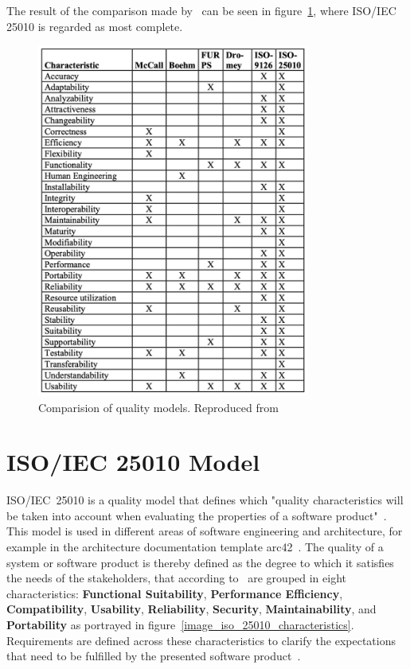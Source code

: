 The result of the comparison made by~\cite{quality_models} can be seen in figure~\ref{image_quality_models_comparison},
where ISO/IEC 25010 is regarded as most complete.

\begin{figure}[h!]
\centering
\includegraphics[width=0.8\textwidth]{images/Untitled_13.png}
\caption{Comparision of quality models. Reproduced from~\cite{quality_models}}
    \label{image_quality_models_comparison}
\end{figure}

\clearpage
\hypertarget{the-isoiec-25010-model}{%
\section{ISO/IEC 25010
Model}\label{the-isoiec-25010-model}}

ISO/IEC\ 25010 is a quality model that defines which "quality
characteristics will be taken into account when evaluating the
properties of a software product"~\cite{iso_25010_online}.
This model is used in different areas of software engineering and
architecture, for example in the architecture documentation template
arc42~\cite{arc42_iso}. The quality of a system or software product is thereby
defined as the degree to which it satisfies the needs of the
stakeholders, that according to~\cite{iso_25010_online} are grouped in eight
characteristics: \textbf{Functional Suitability},
\textbf{Performance Efficiency}, \textbf{Compatibility},
\textbf{Usability}, \textbf{Reliability},
\textbf{Security}, \textbf{Maintainability}, and
\textbf{Portability} as portrayed in figure~\ref{image_iso_25010_characteristics}.
Requirements are defined across these characteristics to clarify the
expectations that need to be fulfilled by the presented software
product~\cite{iso_25010_online}.

